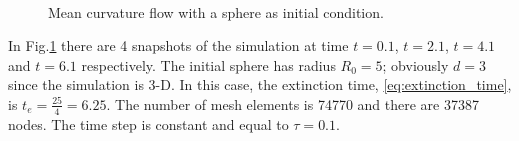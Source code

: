 \documentclass[a4paper,11pt, onecolumn]{article}
\begin{document}
\begin{figure}[htbp]
  \centering
  \quad
  \\
  \quad
  \caption{Mean curvature flow with a sphere as initial condition.}
  \label{fig:mcf_sphere}
\end{figure}

\noindent In Fig.\ref{fig:mcf_sphere} there are 4 snapshots of the simulation at time $t=0.1$, $t=2.1$, $t=4.1$ and $t=6.1$ respectively. The initial sphere has radius $R_0=5$; obviously $d=3$ since the simulation is 3-D. In this case, the extinction time, \eqref{eq:extinction_time}, is $t_e=\frac{25}{4}=6.25$. The number of mesh elements is 74770 and there are 37387 nodes. The time step is constant and equal to $\tau=0.1$.
\newline
\end{document}
